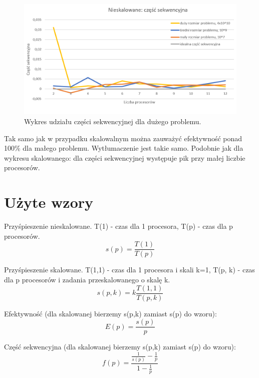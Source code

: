 \documentclass[10pt,english, openany]{book}
\begin{document}
\begin{figure}[H]
\centering
\includegraphics[scale=0.9]{pics/Ns_sekw.png}
\caption{Wykres udziału części sekwencyjnej dla dużego problemu.}
\end{figure}

Tak samo jak w przypadku skalowalnym można zauważyć efektywność ponad 100\% dla małego problemu. Wytłumaczenie jest takie samo. Podobnie jak dla wykresu skalowanego: dla części sekwencyjnej występuje pik przy małej liczbie procesorów.

\chapter{Użyte wzory}
Przyśpieszenie nieskalowane. T(1) - czas dla 1 procesora, T(p) - czas dla p procesorów.
\begin{equation}
s(p)=\frac{T(1)}{T(p)}
\end{equation}

Przyśpieszenie skalowane. T(1,1) - czas dla 1 procesora i skali k=1, T(p, k) - czas dla p procesorów i zadania przeskalowanego o skalę k.
\begin{equation}
s(p,k)=k \frac{T(1,1)}{T(p,k)}
\end{equation}

Efektywność (dla skalowanej bierzemy s(p,k) zamiast s(p) do wzoru):
\begin{equation}
E(p) = \frac{s(p)}{p}
\end{equation}

Część sekwencyjna (dla skalowanej bierzemy s(p,k) zamiast s(p) do wzoru):
\begin{equation}
f(p) = \frac{\frac{1}{s(p)} - \frac{1}{p}}{1 - \frac{1}{p}}
\end{equation}

\justifying
\end{document}
